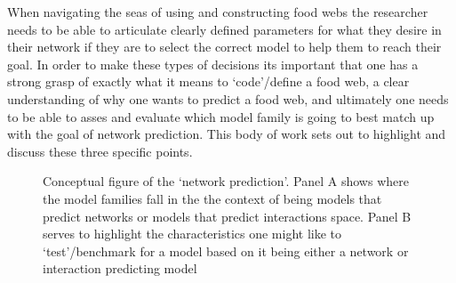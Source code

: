 \documentclass[
]{article}
\begin{document}
When navigating the seas of using and constructing food webs the
researcher needs to be able to articulate clearly defined parameters for
what they desire in their network if they are to select the correct
model to help them to reach their goal. In order to make these types of
decisions its important that one has a strong grasp of exactly what it
means to `code'/define a food web, a clear understanding of why one
wants to predict a food web, and ultimately one needs to be able to
asses and evaluate which model family is going to best match up with the
goal of network prediction. This body of work sets out to highlight and
discuss these three specific points.

\begin{figure}


\caption{\label{fig-concept}Conceptual figure of the `network
prediction'. Panel A shows where the model families fall in the the
context of being models that predict networks or models that predict
interactions space. Panel B serves to highlight the characteristics one
might like to `test'/benchmark for a model based on it being either a
network or interaction predicting model}

\end{figure}%
\end{document}
